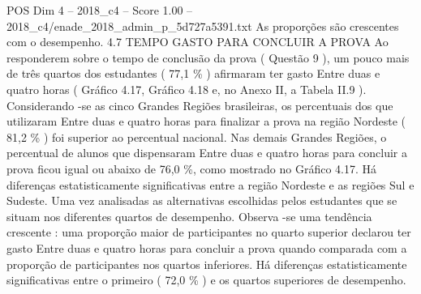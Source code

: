 \begin{textsample}{POS Dim 4 – 2018\_c4 – Score 1.00 – 2018\_c4/enade\_2018\_admin\_p\_5d727a5391.txt}
As proporções são crescentes com o desempenho. 4.7 TEMPO GASTO PARA CONCLUIR A PROVA Ao responderem sobre o tempo de conclusão da prova ( Questão 9 ), um pouco mais de três quartos dos estudantes ( 77,1 \% ) afirmaram ter gasto Entre duas e quatro horas ( Gráfico 4.17, Gráfico 4.18 e, no Anexo II, a Tabela II.9 ).
Considerando -se as cinco Grandes Regiões brasileiras, os percentuais dos que utilizaram Entre duas e quatro horas para finalizar a prova na região Nordeste ( 81,2 \% ) foi superior ao percentual nacional.
Nas demais Grandes Regiões, o percentual de alunos que dispensaram Entre duas e quatro horas para concluir a prova ficou igual ou abaixo de 76,0 \%, como mostrado no Gráfico 4.17.
Há diferenças estatisticamente significativas entre a região Nordeste e as regiões Sul e Sudeste.
Uma vez analisadas as alternativas escolhidas pelos estudantes que se situam nos diferentes quartos de desempenho.
Observa -se uma tendência crescente : uma proporção maior de participantes no quarto superior declarou ter gasto Entre duas e quatro horas para concluir a prova quando comparada com a proporção de participantes nos quartos inferiores.
Há diferenças estatisticamente significativas entre o primeiro ( 72,0 \% ) e os quartos superiores de desempenho.

\end{textsample}

